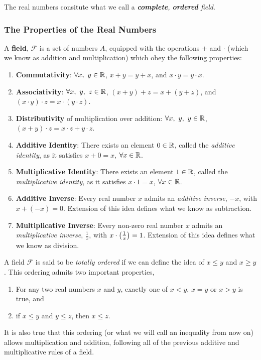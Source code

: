 \documentclass[12pt]{article}
\theoremstyle{definition}
\begin{document}
    \begin{remark}
        The real numbers consitute what we call a \textit{\textbf{complete}, \textbf{ordered} field}.
    \end{remark}

    \newpage

   \subsubsection{The Properties of the Real Numbers}
    A \textbf{field}, $\mathcal{F}$ is a set of numbers $A$, equipped with the operations $+$ and $\cdot$ (which we know as addition and multiplication) which obey the following properties:
    \begin{enumerate}
        \item \textbf{Commutativity}: $\forall x, ~ y \in \R$, $x + y = y + x$, and $x \cdot y = y \cdot x$.
        \item \textbf{Associativity}: $\forall x, ~y, ~z \in \R$, $(x + y) + z = x + (y + z)$, and $(x \cdot y) \cdot z = x \cdot (y \cdot z)$.
        \item \textbf{Distributivity} of multiplication over addition: $\forall x, ~y, ~y \in \R$, $(x + y) \cdot z = x \cdot z + y \cdot z$.
        \item \textbf{Additive Identity}: There exists an element $0 \in \R$, called the \textit{additive identity}, as it satisfies $x + 0 = x$, $\forall x \in \R$.
        \item \textbf{Multiplicative Identity}: There exists an element $1 \in \R$, called the \textit{multiplicative identity}, as it satisfies $x \cdot 1 = x$, $\forall x \in \R$.
        \item \textbf{Additive Inverse}: Every real number $x$ admits an \textit{additive inverse}, $-x$, with $x + (-x) = 0$. Extension of this idea defines what we know as subtraction.
        \item \textbf{Multiplicative Inverse}: Every non-zero real number $x$ admits an \textit{multiplicative inverse}, $\frac{1}{x}$, with $x \cdot \left(\frac{1}{x}\right) = 1$. Extension of this idea defines what we know as division.
    \end{enumerate}

    A field $\mathcal{F}$ is said to be \textit{totally ordered} if we can define the idea of $x \leq y$ and $x \geq y$. This ordering admits two important properties,
    \begin{enumerate}
            \item For any two real numbers $x$ and $y$, exactly one of $x < y$, $x = y$ or $x > y$ is true, and
            \item if $x \leq y$ and $y \leq z$, then $x \leq z$.
    \end{enumerate} 
    It is also true that this ordering (or what we will call an inequality from now on) allows multiplication and addition, following all of the previous additive and multiplicative rules of a field. 
\end{document}
